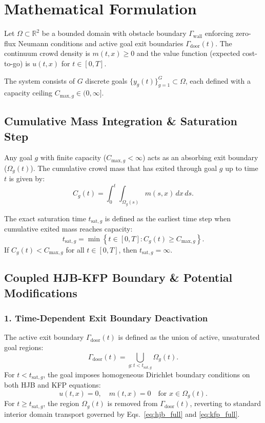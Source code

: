 \documentclass[11pt,a4paper]{article}
\begin{document}
\section{Mathematical Formulation}

Let $\Omega \subset \mathbb{R}^2$ be a bounded domain with obstacle boundary $\Gamma_{\text{wall}}$ enforcing zero-flux Neumann conditions and active goal exit boundaries $\Gamma_{\text{door}}(t)$. The continuum crowd density is $m(t, x) \ge 0$ and the value function (expected cost-to-go) is $u(t, x)$ for $t \in [0, T]$.

The system consists of $G$ discrete goals $\{y_g(t)\}_{g=1}^G \subset \Omega$, each defined with a capacity ceiling $C_{\text{max}, g} \in (0, \infty]$.

\subsection{Cumulative Mass Integration \& Saturation Step}
Any goal $g$ with finite capacity ($C_{\text{max}, g} < \infty$) acts as an absorbing exit boundary ($\Omega_g(t)$). The cumulative crowd mass that has exited through goal $g$ up to time $t$ is given by:
\begin{equation}
\label{eq:cum_mass}
C_g(t) = \int_0^t \int_{\Omega_g(s)} m(s, x) \, dx \, ds.
\end{equation}

The exact saturation time $t_{\text{sat}, g}$ is defined as the earliest time step when cumulative exited mass reaches capacity:
\begin{equation}
t_{\text{sat}, g} = \min \left\{ t \in [0, T] : C_g(t) \ge C_{\text{max}, g} \right\}.
\end{equation}
If $C_g(t) < C_{\text{max}, g}$ for all $t \in [0, T]$, then $t_{\text{sat}, g} = \infty$.

\subsection{Coupled HJB-KFP Boundary \& Potential Modifications}

\subsubsection{1. Time-Dependent Exit Boundary Deactivation}
The active exit boundary $\Gamma_{\text{door}}(t)$ is defined as the union of active, unsaturated goal regions:
\begin{equation}
\Gamma_{\text{door}}(t) = \bigcup_{g : t < t_{\text{sat}, g}} \Omega_g(t).
\end{equation}
For $t < t_{\text{sat}, g}$, the goal imposes homogeneous Dirichlet boundary conditions on both HJB and KFP equations:
\begin{equation}
u(t, x) = 0, \quad m(t, x) = 0 \quad \text{for } x \in \Omega_g(t).
\end{equation}
For $t \ge t_{\text{sat}, g}$, the region $\Omega_g(t)$ is removed from $\Gamma_{\text{door}}(t)$, reverting to standard interior domain transport governed by Eqs.~\eqref{eq:hjb_full} and \eqref{eq:kfp_full}.
\end{document}
